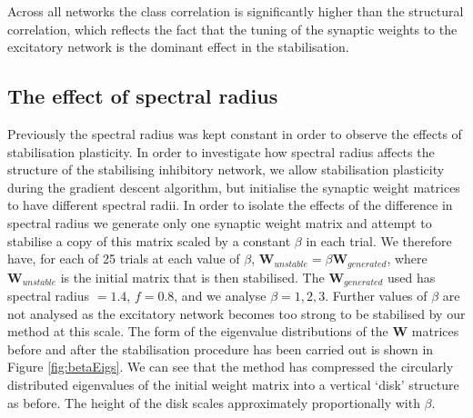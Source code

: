 \documentclass[12pt, a4paper]{article}
\begin{document}
Across all networks the class correlation is significantly higher than the structural correlation, which reflects the fact that the tuning of the synaptic weights to the excitatory network is the dominant effect in the stabilisation.  


\FloatBarrier
\subsection{The effect of spectral radius}

Previously the spectral radius was kept constant in order to observe the effects of stabilisation plasticity.  In order to investigate how spectral radius affects the structure of the stabilising inhibitory network, we allow stabilisation plasticity during the gradient descent algorithm, but initialise the synaptic weight matrices to have different spectral radii.  In order to isolate the effects of the difference in spectral radius we generate only one synaptic weight matrix and attempt to stabilise a copy of this matrix scaled by a constant $\beta$ in each trial.  We therefore have, for each of 25 trials at each value of $\beta$, $\mathbf{W}_{unstable} = \beta \mathbf{W}_{generated}$, where $\mathbf{W}_{unstable}$ is the initial matrix that is then stabilised.  The $\mathbf{W}_{generated}$ used has spectral radius $= 1.4$, $f = 0.8$, and we analyse $\beta = 1,2,3$.  Further values of $\beta$ are not analysed as the excitatory network becomes too strong to be stabilised by our method at this scale.  The form of the eigenvalue distributions of the $\mathbf{W}$ matrices before and after the stabilisation procedure has been carried out is shown in Figure \ref{fig:betaEigs}.  We can see that the method has compressed the circularly distributed eigenvalues of the initial weight matrix into a vertical `disk' structure as before.   The height of the disk scales approximately proportionally with $\beta$.  
\end{document}
